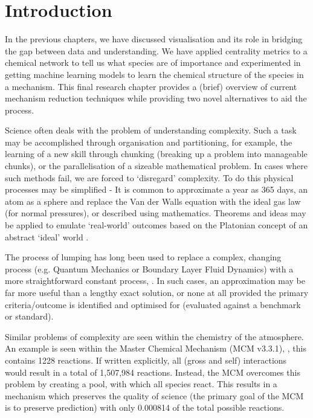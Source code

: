 

\section{Introduction}

In the previous chapters, we have discussed visualisation and its role in bridging the gap between data and understanding. We have applied centrality metrics to a chemical network to tell us what species are of importance and experimented in getting machine learning models to learn the chemical structure of the species in a mechanism. This final research chapter provides a (brief) overview of current mechanism reduction techniques while providing two novel alternatives to aid the process.

Science often deals with the problem of understanding complexity. Such a task may be accomplished through organisation and partitioning, for example, the learning of a new skill through chunking (breaking up a problem into manageable chunks), or the parallelisation of a sizeable mathematical problem. In cases where such methods fail, we are forced to `disregard' complexity. To do this physical processes may be simplified - It is common to approximate a year as 365 days, an atom as a sphere and replace the Van der Walls equation with the ideal gas law (for normal pressures), or described using mathematics. Theorems and ideas may be applied to emulate `real-world' outcomes based on the Platonian concept of an abstract `ideal' world \citep{platoform, physapprox}.

 The process of lumping has long been used to replace a complex, changing process (e.g. Quantum Mechanics or Boundary Layer Fluid Dynamics) with a more straightforward constant process, \citep{approx}. In such cases, an approximation may be far more useful than a lengthy exact solution, or none at all provided the primary criteria/outcome is identified and optimised for (evaluated against a benchmark or standard).

Similar problems of complexity are seen within the chemistry of the atmosphere. An example is seen within the Master Chemical Mechanism (MCM v3.3.1), \citep{mcm}, this contains 1228  reactions. If written explicitly, all  (gross and self) interactions would result in a total of 1,507,984 reactions. Instead, the MCM overcomes this problem by creating a  pool, with which all  species react. This results in a mechanism which preserves the quality of science (the primary goal of the MCM is to preserve  prediction) with only 0.000814 of the total possible  reactions.

